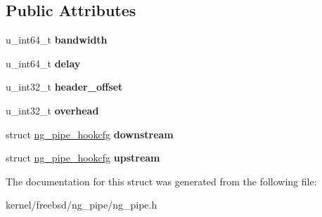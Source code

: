 \subsection*{Public Attributes}
\begin{DoxyCompactItemize}
\item 
\hypertarget{structng__pipe__cfg_a36b5c73c5e5ffe9262d201436a6dc113}{u\+\_\+int64\+\_\+t {\bfseries bandwidth}}\label{structng__pipe__cfg_a36b5c73c5e5ffe9262d201436a6dc113}

\item 
\hypertarget{structng__pipe__cfg_a8661395155b7a1a9f7d8fe253c808927}{u\+\_\+int64\+\_\+t {\bfseries delay}}\label{structng__pipe__cfg_a8661395155b7a1a9f7d8fe253c808927}

\item 
\hypertarget{structng__pipe__cfg_a3b6fae54bcce3d0640dc8355c7a13ec5}{u\+\_\+int32\+\_\+t {\bfseries header\+\_\+offset}}\label{structng__pipe__cfg_a3b6fae54bcce3d0640dc8355c7a13ec5}

\item 
\hypertarget{structng__pipe__cfg_afae1431efbbf4a0db8e6cf27400cbb50}{u\+\_\+int32\+\_\+t {\bfseries overhead}}\label{structng__pipe__cfg_afae1431efbbf4a0db8e6cf27400cbb50}

\item 
\hypertarget{structng__pipe__cfg_a509288143bc4f42a55805a4a801bbdd0}{struct \hyperlink{structng__pipe__hookcfg}{ng\+\_\+pipe\+\_\+hookcfg} {\bfseries downstream}}\label{structng__pipe__cfg_a509288143bc4f42a55805a4a801bbdd0}

\item 
\hypertarget{structng__pipe__cfg_a33bb316d0e64ed28641ce9d5112f3511}{struct \hyperlink{structng__pipe__hookcfg}{ng\+\_\+pipe\+\_\+hookcfg} {\bfseries upstream}}\label{structng__pipe__cfg_a33bb316d0e64ed28641ce9d5112f3511}

\end{DoxyCompactItemize}


The documentation for this struct was generated from the following file\+:\begin{DoxyCompactItemize}
\item 
kernel/freebsd/ng\+\_\+pipe/ng\+\_\+pipe.\+h\end{DoxyCompactItemize}
